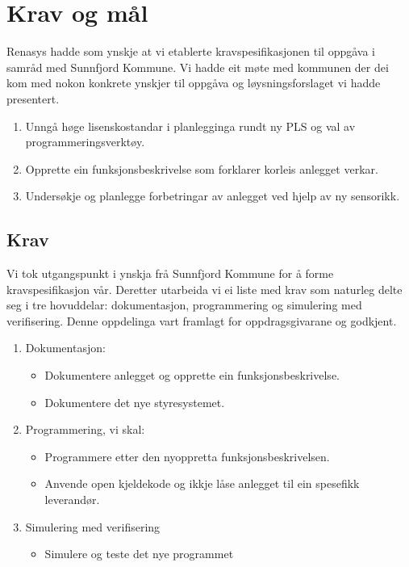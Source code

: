 \chapter{Krav og mål}
\thispagestyle{fancy}
\label{sec: 5}

\gls{Renasys} hadde som ynskje at vi etablerte kravspesifikasjonen til oppgåva 
i samråd med \gls{Sunnfjord Kommune}.\newline
Vi hadde eit møte med kommunen der dei kom med nokon konkrete ynskjer til oppgåva
og løysningsforslaget vi hadde presentert.

\begin{enumerate}
    \item Unngå høge lisenskostandar i planlegginga rundt ny PLS og val av programmeringsverktøy.
    \item Opprette ein funksjonsbeskrivelse som forklarer korleis anlegget verkar.
    \item Undersøkje og planlegge forbetringar av anlegget ved hjelp av ny sensorikk.
\end{enumerate}

\section{Krav}
Vi tok utgangspunkt i ynskja frå \gls{Sunnfjord Kommune} for å forme kravspesifikasjon vår.
Deretter utarbeida vi ei liste med krav som naturleg delte seg i tre
hovuddelar: dokumentasjon, programmering og simulering med verifisering. 
Denne oppdelinga vart framlagt for oppdragsgivarane og godkjent. 

\begin{enumerate}
    \item Dokumentasjon:
    \begin{itemize}
        \item Dokumentere anlegget og opprette ein funksjonsbeskrivelse.
        \item Dokumentere det nye styresystemet.
    \end{itemize}
    \item Programmering, vi skal:
    \begin{itemize}
        \item Programmere etter den nyoppretta funksjonsbeskrivelsen.
        \item Anvende open kjeldekode og ikkje låse anlegget til ein spesefikk leverandør.
    \end{itemize}
    \item Simulering med verifisering
    \begin{itemize}
        \item Simulere og teste det nye programmet
    \end{itemize}
\end{enumerate}


